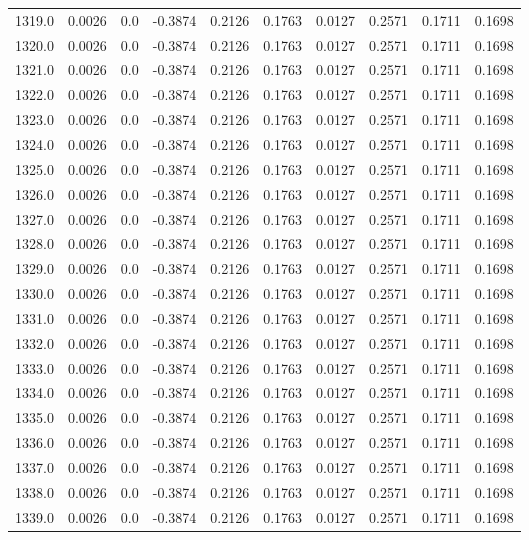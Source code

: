 \begin{longtable}{lrrrrrrrrr}
1319.0 & 0.0026 & 0.0 & -0.3874 & 0.2126 & 0.1763 & 0.0127 & 0.2571 & 0.1711 & 0.1698 \\
1320.0 & 0.0026 & 0.0 & -0.3874 & 0.2126 & 0.1763 & 0.0127 & 0.2571 & 0.1711 & 0.1698 \\
1321.0 & 0.0026 & 0.0 & -0.3874 & 0.2126 & 0.1763 & 0.0127 & 0.2571 & 0.1711 & 0.1698 \\
1322.0 & 0.0026 & 0.0 & -0.3874 & 0.2126 & 0.1763 & 0.0127 & 0.2571 & 0.1711 & 0.1698 \\
1323.0 & 0.0026 & 0.0 & -0.3874 & 0.2126 & 0.1763 & 0.0127 & 0.2571 & 0.1711 & 0.1698 \\
1324.0 & 0.0026 & 0.0 & -0.3874 & 0.2126 & 0.1763 & 0.0127 & 0.2571 & 0.1711 & 0.1698 \\
1325.0 & 0.0026 & 0.0 & -0.3874 & 0.2126 & 0.1763 & 0.0127 & 0.2571 & 0.1711 & 0.1698 \\
1326.0 & 0.0026 & 0.0 & -0.3874 & 0.2126 & 0.1763 & 0.0127 & 0.2571 & 0.1711 & 0.1698 \\
1327.0 & 0.0026 & 0.0 & -0.3874 & 0.2126 & 0.1763 & 0.0127 & 0.2571 & 0.1711 & 0.1698 \\
1328.0 & 0.0026 & 0.0 & -0.3874 & 0.2126 & 0.1763 & 0.0127 & 0.2571 & 0.1711 & 0.1698 \\
1329.0 & 0.0026 & 0.0 & -0.3874 & 0.2126 & 0.1763 & 0.0127 & 0.2571 & 0.1711 & 0.1698 \\
1330.0 & 0.0026 & 0.0 & -0.3874 & 0.2126 & 0.1763 & 0.0127 & 0.2571 & 0.1711 & 0.1698 \\
1331.0 & 0.0026 & 0.0 & -0.3874 & 0.2126 & 0.1763 & 0.0127 & 0.2571 & 0.1711 & 0.1698 \\
1332.0 & 0.0026 & 0.0 & -0.3874 & 0.2126 & 0.1763 & 0.0127 & 0.2571 & 0.1711 & 0.1698 \\
1333.0 & 0.0026 & 0.0 & -0.3874 & 0.2126 & 0.1763 & 0.0127 & 0.2571 & 0.1711 & 0.1698 \\
1334.0 & 0.0026 & 0.0 & -0.3874 & 0.2126 & 0.1763 & 0.0127 & 0.2571 & 0.1711 & 0.1698 \\
1335.0 & 0.0026 & 0.0 & -0.3874 & 0.2126 & 0.1763 & 0.0127 & 0.2571 & 0.1711 & 0.1698 \\
1336.0 & 0.0026 & 0.0 & -0.3874 & 0.2126 & 0.1763 & 0.0127 & 0.2571 & 0.1711 & 0.1698 \\
1337.0 & 0.0026 & 0.0 & -0.3874 & 0.2126 & 0.1763 & 0.0127 & 0.2571 & 0.1711 & 0.1698 \\
1338.0 & 0.0026 & 0.0 & -0.3874 & 0.2126 & 0.1763 & 0.0127 & 0.2571 & 0.1711 & 0.1698 \\
1339.0 & 0.0026 & 0.0 & -0.3874 & 0.2126 & 0.1763 & 0.0127 & 0.2571 & 0.1711 & 0.1698 \\

\end{longtable}
